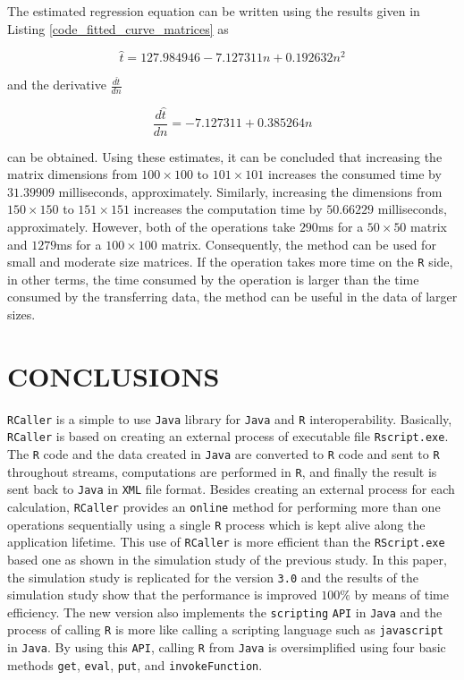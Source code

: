 \documentclass[10pt,a4paper, final, oneside]{article}
\begin{document}
The estimated regression equation can be written using the results given in Listing \ref{code_fitted_curve_matrices} as

\begin{equation}
\hat{t} = 127.984946 - 7.127311n + 0.192632n^2
\end{equation}

\noindent and the derivative $\frac{d \hat{t}}{dn}$ 

\begin{equation}
\frac{d \hat{t}}{dn} = - 7.127311 + 0.385264n
\end{equation}

\noindent can be obtained. Using these estimates, it can be concluded that increasing the matrix dimensions from $100 \times 100$ to $101 \times 101$ increases the consumed time by $31.39909$ milliseconds, approximately. Similarly, increasing the dimensions from $150 \times 150$ to $151 \times 151$ increases the computation time by $50.66229$ milliseconds, approximately. However, both of the operations take $290$ms for a $50 \times 50$ matrix and $1279$ms for a $100 \times 100$ matrix. Consequently, the method can be used for small and moderate size matrices. If the operation takes more time on the \texttt{R} side, in other terms, the time consumed by the operation is larger than the time consumed by the transferring data, the method can be useful in the data of larger sizes. 




\section{CONCLUSIONS}
\label{sec:conclusion}
\texttt{RCaller} is a simple to use \texttt{Java} library for \texttt{Java} and \texttt{R} interoperability.
Basically, \texttt{RCaller} is based on creating an external process of executable file \texttt{Rscript.exe}. The \texttt{R} code and the data created in \texttt{Java} are converted to \texttt{R} code and sent to \texttt{R} throughout streams, computations are performed in \texttt{R}, and finally the result is sent back to \texttt{Java} in \texttt{XML} file format. Besides creating an external process for each calculation, \texttt{RCaller} provides an \texttt{online} method for performing more than one operations sequentially using a single \texttt{R} process which is kept alive along the application lifetime. This use of \texttt{RCaller} is more efficient than the \texttt{RScript.exe} based one as shown in the simulation study of the previous study. In this paper, the simulation study is replicated for the version \texttt{3.0} and the results of the simulation study show that the performance is improved $100\%$ by means of time efficiency. The new version also implements the \texttt{scripting} \texttt{API} in \texttt{Java} and the process of calling \texttt{R} is more like calling a scripting language such as \texttt{javascript} in \texttt{Java}. By using this \texttt{API}, calling \texttt{R} from \texttt{Java} is oversimplified using four basic methods \texttt{get}, \texttt{eval}, \texttt{put}, and \texttt{invokeFunction}. 
\end{document}
